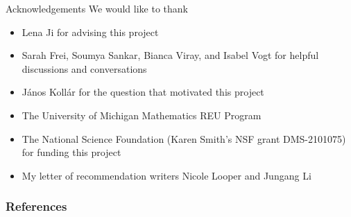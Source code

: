 \documentclass[hyperref, notheorems]{beamer}
\theoremstyle{definition}
\begin{document}
\begin{frame}{Acknowledgements}
We would like to thank
\begin{itemize}
    \item Lena Ji for advising this project
    \item Sarah Frei, Soumya Sankar, Bianca Viray, and Isabel Vogt for helpful discussions and conversations 
    \item János Kollár for the question that motivated this project
    \item The University of Michigan Mathematics REU Program
    \item The National Science Foundation (Karen Smith’s NSF grant DMS-2101075) for funding this project
    \item My letter of recommendation writers Nicole Looper and Jungang Li
\end{itemize}

\end{frame}

\begin{frame}[allowframebreaks]
\frametitle{References}


\end{frame}
\end{document}
